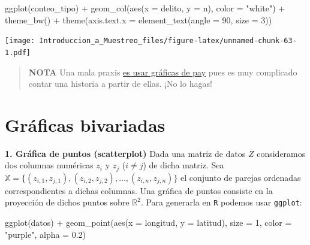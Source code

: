 \documentclass[
]{book}
\newenvironment{Shaded}{\begin{snugshade}}{\end{snugshade}}
\newcommand{\AttributeTok}[1]{\textcolor[rgb]{0.77,0.63,0.00}{#1}}
\newcommand{\DecValTok}[1]{\textcolor[rgb]{0.00,0.00,0.81}{#1}}
\newcommand{\FloatTok}[1]{\textcolor[rgb]{0.00,0.00,0.81}{#1}}
\newcommand{\FunctionTok}[1]{\textcolor[rgb]{0.00,0.00,0.00}{#1}}
\newcommand{\NormalTok}[1]{#1}
\newcommand{\SpecialCharTok}[1]{\textcolor[rgb]{0.00,0.00,0.00}{#1}}
\newcommand{\StringTok}[1]{\textcolor[rgb]{0.31,0.60,0.02}{#1}}
\begin{document}
\begin{Shaded}
\begin{Highlighting}[]
\FunctionTok{ggplot}\NormalTok{(conteo\_tipo) }\SpecialCharTok{+}
  \FunctionTok{geom\_col}\NormalTok{(}\FunctionTok{aes}\NormalTok{(}\AttributeTok{x =}\NormalTok{ delito, }\AttributeTok{y =}\NormalTok{ n), }\AttributeTok{color =} \StringTok{"white"}\NormalTok{) }\SpecialCharTok{+}
  \FunctionTok{theme\_bw}\NormalTok{() }\SpecialCharTok{+}
  \FunctionTok{theme}\NormalTok{(}\AttributeTok{axis.text.x =} \FunctionTok{element\_text}\NormalTok{(}\AttributeTok{angle =} \DecValTok{90}\NormalTok{, }\AttributeTok{size =} \DecValTok{3}\NormalTok{))}
\end{Highlighting}
\end{Shaded}

\texttt{[image: Introduccion\_a\_Muestreo\_files/figure-latex/unnamed-chunk-63-1.pdf]}

\begin{quote}
\textbf{NOTA} Una mala praxis \href{https://www.data-to-viz.com/caveat/pie.html}{es usar gráficas de pay} pues es muy complicado contar una historia a partir de ellas. ¡No lo hagas!
\end{quote}

\hypertarget{gruxe1ficas-bivariadas}{%
\section{Gráficas bivariadas}\label{gruxe1ficas-bivariadas}}

\textbf{1. Gráfica de puntos (scatterplot)} Dada una matriz de datos \(Z\) consideramos dos columnas numéricas \(z_i\) y \(z_j\) (\(i \neq j\)) de dicha matriz. Sea \(\mathbb{X} = \{ (z_{i,1}, z_{j,1}), (z_{i,2}, z_{j,2}), \dots, (z_{i,n}, z_{j,n}) \}\) el conjunto de parejas ordenadas correspondientes a dichas columnas. Una gráfica de puntos consiste en la proyección de dichos puntos sobre \(\mathbb{R}^2\). Para generarla en \texttt{R} podemos usar \texttt{ggplot}:

\begin{Shaded}
\begin{Highlighting}[]
\FunctionTok{ggplot}\NormalTok{(datos) }\SpecialCharTok{+}
  \FunctionTok{geom\_point}\NormalTok{(}\FunctionTok{aes}\NormalTok{(}\AttributeTok{x =}\NormalTok{ longitud, }\AttributeTok{y =}\NormalTok{ latitud), }\AttributeTok{size =} \DecValTok{1}\NormalTok{, }\AttributeTok{color =} \StringTok{"purple"}\NormalTok{,}
             \AttributeTok{alpha =} \FloatTok{0.2}\NormalTok{)}
\end{Highlighting}
\end{Shaded}
\end{document}
